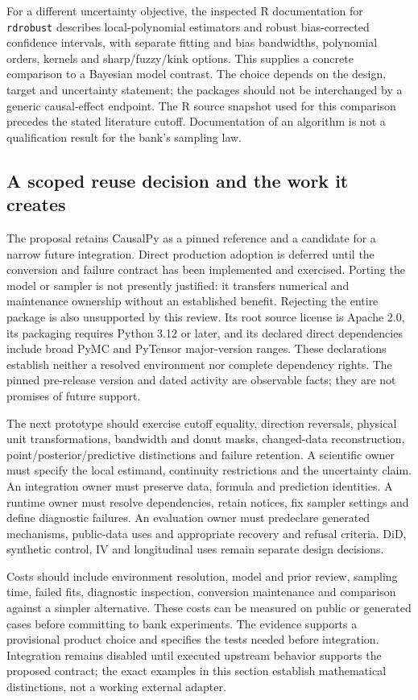 For a different uncertainty objective, the inspected R documentation for
\texttt{rdrobust} describes local-polynomial estimators and robust bias-corrected
confidence intervals, with separate fitting and bias bandwidths, polynomial
orders, kernels and sharp/fuzzy/kink options. This supplies a concrete comparison
to a Bayesian model contrast. The choice depends on the design, target and
uncertainty statement; the packages should not be interchanged by a generic
causal-effect endpoint. The R source snapshot used for this comparison
precedes the stated literature cutoff. Documentation of an algorithm is not a
qualification result for the bank's sampling law.~\citep{v12_sw_rdrobust}

\subsection{A scoped reuse decision and the work it creates}

The proposal retains CausalPy as a pinned reference and a candidate for a narrow
future integration. Direct production adoption is deferred until the conversion
and failure contract has been implemented and exercised. Porting the model or
sampler is not presently justified: it transfers numerical and maintenance
ownership without an established benefit. Rejecting the entire package is also
unsupported by this review. Its root source license is Apache 2.0, its packaging
requires Python 3.12 or later, and its declared direct dependencies include broad
PyMC and PyTensor major-version ranges. These declarations establish neither a
resolved environment nor complete dependency rights. The pinned pre-release
version and dated activity are observable facts; they are not promises of future
support.~\citep{exec14_causalpy_primary,exec14_causalpy_decision}

The next prototype should exercise cutoff equality, direction reversals, physical
unit transformations, bandwidth and donut masks, changed-data reconstruction,
point/posterior/predictive distinctions and failure retention. A scientific owner
must specify the local estimand, continuity restrictions and the uncertainty
claim. An integration owner must preserve data, formula and prediction identities.
A runtime owner must resolve dependencies, retain notices, fix sampler settings
and define diagnostic failures. An evaluation owner must predeclare generated
mechanisms, public-data uses and appropriate recovery and refusal criteria.
DiD, synthetic control, IV and longitudinal uses remain separate design decisions.
\citep{exec14_causalpy_decision}

Costs should include environment resolution, model and prior review, sampling
time, failed fits, diagnostic inspection, conversion maintenance and comparison
against a simpler alternative. These costs can be measured on public or generated
cases before committing to bank experiments. The evidence supports a provisional product choice and specifies the tests needed before integration. Integration
remains disabled until executed upstream behavior supports the proposed contract;
the exact examples in this section establish mathematical distinctions, not a
working external adapter.~\citep{exec14_causalpy_decision}
\label{exec14:causalpy-contract-end}
